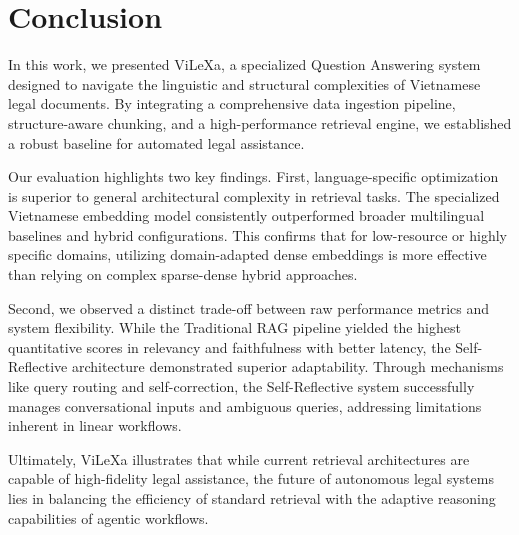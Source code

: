 \documentclass[letterpaper]{article} %
\begin{document}
\section{Conclusion}

In this work, we presented ViLeXa, a specialized Question Answering system designed to navigate the linguistic and structural complexities of Vietnamese legal documents. By integrating a comprehensive data ingestion pipeline, structure-aware chunking, and a high-performance retrieval engine, we established a robust baseline for automated legal assistance.

Our evaluation highlights two key findings. First, language-specific optimization is superior to general architectural complexity in retrieval tasks. The specialized Vietnamese embedding model consistently outperformed broader multilingual baselines and hybrid configurations. This confirms that for low-resource or highly specific domains, utilizing domain-adapted dense embeddings is more effective than relying on complex sparse-dense hybrid approaches.

Second, we observed a distinct trade-off between raw performance metrics and system flexibility. While the Traditional RAG pipeline yielded the highest quantitative scores in relevancy and faithfulness with better latency, the Self-Reflective architecture demonstrated superior adaptability. Through mechanisms like query routing and self-correction, the Self-Reflective system successfully manages conversational inputs and ambiguous queries, addressing limitations inherent in linear workflows.

Ultimately, ViLeXa illustrates that while current retrieval architectures are capable of high-fidelity legal assistance, the future of autonomous legal systems lies in balancing the efficiency of standard retrieval with the adaptive reasoning capabilities of agentic workflows.



\end{document}
